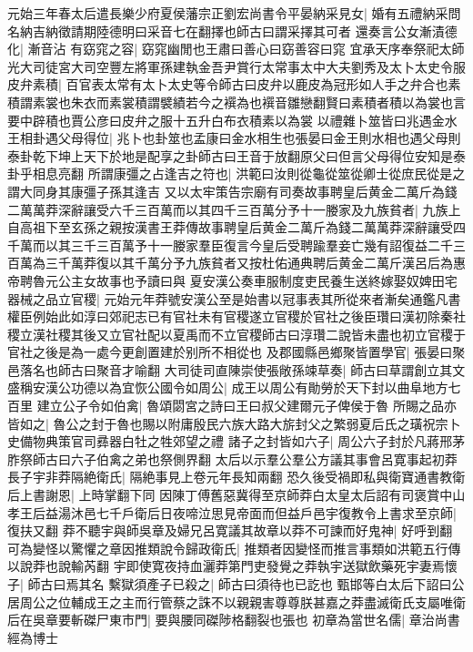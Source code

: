 元始三年春太后遣長樂少府夏侯藩宗正劉宏尚書令平晏納采見女|{
	婚有五禮納采問名納吉納徵請期陸德明曰采音七在翻擇也師古曰謂采擇其可者}
還奏言公女漸漬德化|{
	漸音沾}
有窈窕之容|{
	窈窕幽閒也王肅曰善心曰窈善容曰窕}
宜承天序奉祭祀太師光大司徒宮大司空豐左將軍孫建執金吾尹賞行太常事太中大夫劉秀及太卜太史令服皮弁素積|{
	百官表太常有太卜太史等令師古曰皮弁以鹿皮為冠形如人手之弁合也素積謂素裳也朱衣而素裳積謂襞績若今之襈為也襈音雛戀翻賢曰素積者積以為裳也言要中辟積也賈公彦曰皮弁之服十五升白布衣積素以為裳}
以禮雜卜筮皆曰兆遇金水王相卦遇父母得位|{
	兆卜也卦筮也孟康曰金水相生也張晏曰金王則水相也遇父母則泰卦乾下坤上天下於地是配享之卦師古曰王音于放翻原父曰但言父母得位安知是泰卦乎相息亮翻}
所謂康彊之占逢吉之符也|{
	洪範曰汝則從龜從筮從卿士從庶民從是之謂大同身其康彊子孫其逢吉}
又以太牢策告宗廟有司奏故事聘皇后黄金二萬斤為錢二萬萬莽深辭讓受六千三百萬而以其四千三百萬分予十一媵家及九族貧者|{
	九族上自高祖下至玄孫之親按漢書王莽傳故事聘皇后黄金二萬斤為錢二萬萬莽深辭讓受四千萬而以其三千三百萬予十一媵家羣臣復言今皇后受聘踰羣妾亡幾有詔復益二千三百萬為三千萬莽復以其千萬分予九族貧者又按杜佑通典聘后黄金二萬斤漢呂后為惠帝聘魯元公主女故事也予讀曰與}
夏安漢公奏車服制度吏民養生送終嫁娶奴婢田宅器械之品立官稷|{
	元始元年莽號安漢公至是始書以冠事表其所從來者漸矣通鑑凡書權臣例始此如淳曰郊祀志已有官社未有官稷遂立官稷於官社之後臣瓚曰漢初除秦社稷立漢社稷其後又立官社配以夏禹而不立官稷師古曰淳瓚二說皆未盡也初立官稷于官社之後是為一處今更創置建於别所不相從也}
及郡國縣邑鄉聚皆置學官|{
	張晏曰聚邑落名也師古曰聚音才喻翻}
大司徒司直陳崇使張敞孫竦草奏|{
	師古曰草謂創立其文}
盛稱安漢公功德以為宜恢公國令如周公|{
	成王以周公有勛勞於天下封以曲阜地方七百里}
建立公子令如伯禽|{
	魯頌閟宮之詩曰王曰叔父建爾元子俾侯于魯}
所賜之品亦皆如之|{
	魯公之封于魯也賜以附庸殷民六族大路大旂封父之繁弱夏后氏之璜祝宗卜史備物典策官司彞器白牡之牲郊望之禮}
諸子之封皆如六子|{
	周公六子封於凡蔣邢茅胙祭師古曰六子伯禽之弟也祭側界翻}
太后以示羣公羣公方議其事會呂寛事起初莽長子宇非莽隔絶衛氏|{
	隔絶事見上卷元年長知兩翻}
恐久後受禍即私與衛寶通書教衛后上書謝恩|{
	上時掌翻下同}
因陳丁傅舊惡冀得至京師莽白太皇太后詔有司褒賞中山孝王后益湯沐邑七千戶衛后日夜啼泣思見帝面而但益戶邑宇復教令上書求至京師|{
	復扶又翻}
莽不聽宇與師吳章及婦兄呂寛議其故章以莽不可諫而好鬼神|{
	好呼到翻}
可為變怪以驚懼之章因推類說令歸政衛氏|{
	推類者因變怪而推言事類如洪範五行傳以說莽也說輸芮翻}
宇即使寛夜持血灑莽第門吏發覺之莽執宇送獄飲藥死宇妻焉懷子|{
	師古曰焉其名}
繫獄須產子已殺之|{
	師古曰須待也已訖也}
甄邯等白太后下詔曰公居周公之位輔成王之主而行管蔡之誅不以親親害尊尊朕甚嘉之莽盡滅衛氏支屬唯衛后在吳章要斬磔尸東市門|{
	要與腰同磔陟格翻裂也張也}
初章為當世名儒|{
	章治尚書經為博士}
